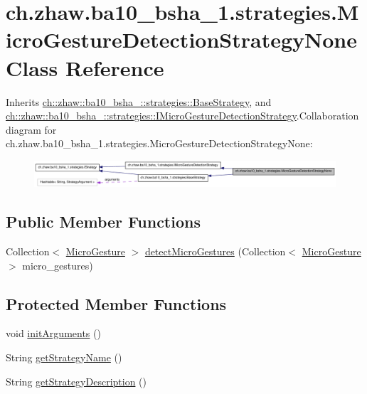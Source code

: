 \hypertarget{classch_1_1zhaw_1_1ba10__bsha__1_1_1strategies_1_1MicroGestureDetectionStrategyNone}{
\section{ch.zhaw.ba10\_\-bsha\_\-1.strategies.MicroGestureDetectionStrategyNone Class Reference}
\label{classch_1_1zhaw_1_1ba10__bsha__1_1_1strategies_1_1MicroGestureDetectionStrategyNone}
}


Inherits \hyperlink{classch_1_1zhaw_1_1ba10__bsha__1_1_1strategies_1_1BaseStrategy}{ch::zhaw::ba10\_\-bsha\_::strategies::BaseStrategy}, and \hyperlink{interfacech_1_1zhaw_1_1ba10__bsha__1_1_1strategies_1_1IMicroGestureDetectionStrategy}{ch::zhaw::ba10\_\-bsha\_::strategies::IMicroGestureDetectionStrategy}.Collaboration diagram for ch.zhaw.ba10\_\-bsha\_\-1.strategies.MicroGestureDetectionStrategyNone:\nopagebreak
\begin{figure}[H]
\begin{center}
\leavevmode
\includegraphics[width=400pt]{classch_1_1zhaw_1_1ba10__bsha__1_1_1strategies_1_1MicroGestureDetectionStrategyNone__coll__graph}
\end{center}
\end{figure}
\subsection*{Public Member Functions}
\begin{DoxyCompactItemize}
\item 
Collection$<$ \hyperlink{classch_1_1zhaw_1_1ba10__bsha__1_1_1service_1_1MicroGesture}{MicroGesture} $>$ \hyperlink{classch_1_1zhaw_1_1ba10__bsha__1_1_1strategies_1_1MicroGestureDetectionStrategyNone_affb5fbb496f04e53720496e1cc3feb88}{detectMicroGestures} (Collection$<$ \hyperlink{classch_1_1zhaw_1_1ba10__bsha__1_1_1service_1_1MicroGesture}{MicroGesture} $>$ micro\_\-gestures)
\end{DoxyCompactItemize}
\subsection*{Protected Member Functions}
\begin{DoxyCompactItemize}
\item 
void \hyperlink{classch_1_1zhaw_1_1ba10__bsha__1_1_1strategies_1_1MicroGestureDetectionStrategyNone_a61ad4d054ea04b24bf364d99f866e35c}{initArguments} ()
\item 
String \hyperlink{classch_1_1zhaw_1_1ba10__bsha__1_1_1strategies_1_1MicroGestureDetectionStrategyNone_a2e46564a49ac92530fc648e3149d5ee4}{getStrategyName} ()
\item 
String \hyperlink{classch_1_1zhaw_1_1ba10__bsha__1_1_1strategies_1_1MicroGestureDetectionStrategyNone_ad6f173fc0670d819bfa82551fc9775f5}{getStrategyDescription} ()
\end{DoxyCompactItemize}


